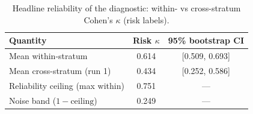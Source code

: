 \begin{table}[htbp]
\centering
\caption{Headline reliability of the diagnostic: within- vs cross-stratum Cohen's $\kappa$ (risk labels).}
\label{tab:reliability_headline}
\begin{tabular}{lcc}
\toprule
Quantity & Risk $\kappa$ & 95\% bootstrap CI \\
\midrule
Mean within-stratum & 0.614 & [0.509, 0.693] \\
Mean cross-stratum (run 1) & 0.434 & [0.252, 0.586] \\
Reliability ceiling (max within) & 0.751 & --- \\
Noise band ($1-\mathrm{ceiling}$) & 0.249 & --- \\
\bottomrule
\end{tabular}
\end{table}
